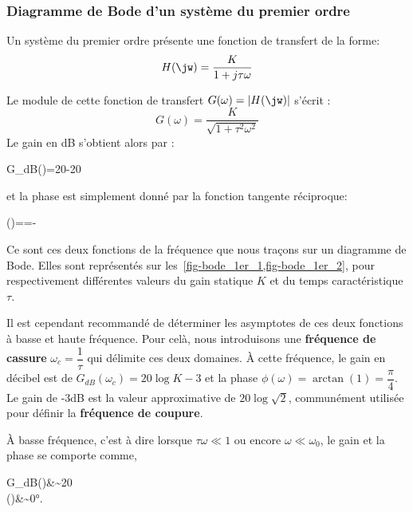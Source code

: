 \subsubsection{Diagramme de Bode d'un système du premier ordre}


Un système du premier ordre présente une fonction de transfert de la forme:
\begin{align}
H(\jw)=\dfrac{K}{1+j\tau\omega }\label{eq-1er_ftjw}
\end{align}

Le module de cette fonction de transfert $G(\omega) =|H(\jw)|$ s'écrit :
$$G(\omega)=\dfrac{K}{\sqrt{1+\tau^2\omega^2}}$$
Le gain en dB s'obtient alors par :
\begin{bequation}
    G_{dB}(\omega)=20-20\label{eq-gain_1er}
\end{bequation}
et la phase est simplement donné par la fonction tangente réciproque:
\begin{bequation}
    \phi(\omega)==-\arctan{(\tau\omega)}\label{eq-phase_1er} 
\end{bequation}
Ce sont ces deux fonctions de la fréquence que nous traçons sur un diagramme de Bode.
Elles sont représentés sur les~\cref{fig-bode_1er_1,fig-bode_1er_2}, pour respectivement différentes valeurs 
du gain statique $K$ et du temps caractéristique $\tau$.
\newline

Il est cependant recommandé de déterminer les asymptotes 
de ces deux fonctions à basse et haute fréquence. 
Pour celà, nous introduisons une \textbf{fréquence de cassure} $\omega_c=\dfrac{1}{\tau}$ 
qui délimite ces deux domaines.
\`A cette fréquence, le gain en décibel est de $G_{dB}(\omega_c)=20\log{K}-3$ et la phase 
$\phi(\omega)=\arctan{(1)}=\dfrac{\pi}{4}$. 
Le gain de -3dB est la valeur approximative de $20\log{\sqrt{2}}$, communément utilisée pour définir la 
\textbf{fréquence de coupure}.

\`A basse fréquence, c'est à dire lorsque $\tau\omega\ll1$ ou encore $\omega\ll\omega_0$, 
le gain et la phase se comporte comme, 
\begin{bequation}
    G_{dB}(\omega)&\sim20 \\
    \phi(\omega)&\sim0\si{\degree}.
\end{bequation} 

